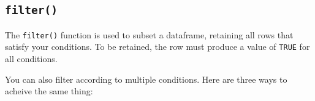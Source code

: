 \documentclass[
]{book}
\newenvironment{Shaded}{\begin{snugshade}}{\end{snugshade}}
\newcommand{\DecValTok}[1]{\textcolor[rgb]{0.00,0.00,0.81}{#1}}
\newcommand{\KeywordTok}[1]{\textcolor[rgb]{0.13,0.29,0.53}{\textbf{#1}}}
\newcommand{\NormalTok}[1]{#1}
\newcommand{\OperatorTok}[1]{\textcolor[rgb]{0.81,0.36,0.00}{\textbf{#1}}}
\newcommand{\StringTok}[1]{\textcolor[rgb]{0.31,0.60,0.02}{#1}}
\begin{document}
\hypertarget{filter}{%
\subsection*{\texorpdfstring{\texttt{filter()}}{filter()}}\label{filter}}

The \texttt{filter()} function is used to subset a dataframe, retaining all rows that satisfy your conditions. To be retained, the row must produce a value of \texttt{TRUE} for all conditions.

\begin{Shaded}
\end{Shaded}

\begin{Shaded}
\end{Shaded}

You can also filter according to multiple conditions. Here are three ways to acheive the same thing:

\begin{Shaded}
\end{Shaded}

\begin{Shaded}
\end{Shaded}
\end{document}
